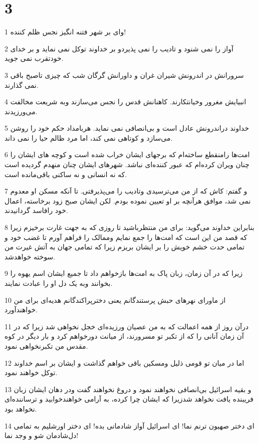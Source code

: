 \chapter{3}

\par 1 وای بر شهر فتنه انگیز نجس ظلم کننده!
\par 2 آواز را نمی شنود و تادیب را نمی پذیردو بر خداوند توکل نمی نماید و بر خدای خودتقرب نمی جوید.
\par 3 سرورانش در اندرونش شیران غران و داورانش گرگان شب که چیزی تاصبح باقی نمی گذارند.
\par 4 انبیایش مغرور وخیانتکارند. کاهنانش قدس را نجس می‌سازند وبه شریعت مخالفت می‌ورزیدند.
\par 5 خداوند دراندرونش عادل است و بی‌انصافی نمی نماید. هربامداد حکم خود را روشن می‌سازد و کوتاهی نمی کند، اما مرد ظالم حیا را نمی داند.
\par 6 امت‌ها رامنقطع ساخته‌ام که برجهای ایشان خراب شده است و کوچه های ایشان را چنان ویران کرده‌ام که عبور کننده‌ای نباشد. شهرهای ایشان چنان منهدم گردیده است که نه انسانی و نه ساکنی باقی‌مانده است.
\par 7 و گفتم: کاش که از من می‌ترسیدی وتادیب را می‌پذیرفتی. تا آنکه مسکن او معدوم نمی شد، موافق هر‌آنچه بر او تعیین نموده بودم. لکن ایشان صبح زود برخاسته، اعمال خود رافاسد گردانیدند.
\par 8 بنابراین خداوند می‌گوید: برای من منتظرباشید تا روزی که به جهت غارت برخیزم زیرا که قصد من این است که امت‌ها را جمع نمایم وممالک را فراهم آورم تا غضب خود و تمامی حدت خشم خویش را بر ایشان بریزم زیرا که تمامی جهان به آتش غیرت من سوخته خواهدشد.
\par 9 زیرا که در آن زمان، زبان پاک به امت‌ها بازخواهم داد تا جمیع ایشان اسم یهوه را بخوانند وبه یک دل او را عبادت نمایند.
\par 10 از ماورای نهرهای حبش پرستندگانم یعنی دخترپراکندگانم هدیه‌ای برای من خواهند‌آورد.
\par 11 درآن روز از همه اعمالت که به من عصیان ورزیده‌ای خجل نخواهی شد زیرا که در آن زمان آنانی را که از تکبر تو مسرورند، از میانت دورخواهم کرد و بار دیگر در کوه مقدس من تکبرنخواهی نمود.
\par 12 اما در میان تو قومی ذلیل ومسکین باقی خواهم گذاشت و ایشان بر اسم خداوند توکل خواهند نمود.
\par 13 و بقیه اسرائیل بی‌انصافی نخواهند نمود و دروغ نخواهند گفت ودر دهان ایشان زبان فریبنده یافت نخواهد شدزیرا که ایشان چرا کرده، به آرامی خواهندخوابید و ترساننده‌ای نخواهد بود.
\par 14 ‌ای دختر صهیون ترنم نما! ای اسرائیل آواز شادمانی بده! ای دختر اورشلیم به تمامی دل‌شادمان شو و وجد نما!
